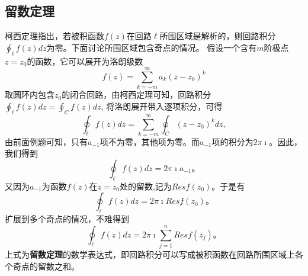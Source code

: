 \subsection{留数定理}
\label{subsec:residual_theorem}
柯西定理指出，若被积函数$f(z)$在回路$\ell$所围区域是解析的，则回路积分$\oint_\ell f(z) dz$为零。下面讨论所围区域包含奇点的情况。
假设一个含有$m$阶极点$z=z_0$的函数，它可以展开为洛朗级数
\[
  f(z) = \sum_{k = -m} ^{\infty} a_k (z - z_0)^k  
\]
取圆环内包含$z_0$的闭合回路，由柯西定理可知，回路积分$\oint_\ell f(z) dz = \oint_C f(z) dz$, 将洛朗展开带入逐项积分，可得
\[
\oint_\ell f(z) dz = \sum_{k = -m} ^{\infty} \oint_C  (z - z_0)^k dz,
\]
由前面例题可知，只有$a_{-1}$项不为零，其他项为零。而$a_{-1}$项的积分为$2\pi\imath$。因此，我们得到
\begin{equation}
    \oint_\ell f(z) dz = 2\pi \imath a_{-1} \textrm{。}
\end{equation}
又因为$a_{-1}$为函数$f(z)$在$z=z_0$处的留数,记为$Res f(z_0)$。于是有
\begin{equation}
    \oint_\ell f(z) dz = 2\pi \imath Res f(z_0) \textrm{。}
\end{equation}
扩展到多个奇点的情况，不难得到
\begin{equation}
    \oint_\ell f(z) dz = 2\pi \imath \sum_{j=1}^{n} Res f(z_j) \textrm{。}
\end{equation}
上式为\textbf{留数定理}的数学表达式，即回路积分可以写成被积函数在回路所围区域上各个奇点的留数之和。

